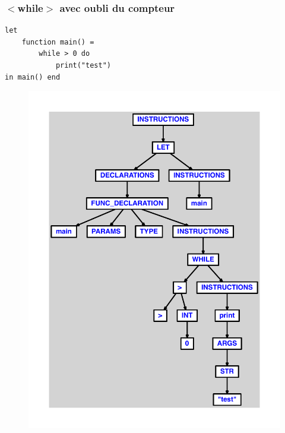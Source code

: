 \documentclass{article}
\begin{document}
\subsubsection{$ < $while$ > $ avec oubli du compteur}
\begin{lstlisting}
let
	function main() =
		while > 0 do
			print("test")
in main() end
\end{lstlisting}
\newpage
\begin{figure}[H]
\centering
\includegraphics[max width=\textwidth]{ast/ast_325.pdf}
\end{figure}
\newpage
\end{document}
